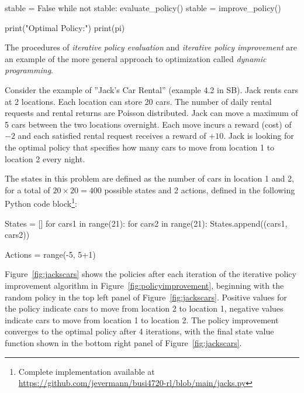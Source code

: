 \begin{samepage}
\begin{pythoncode}
stable = False
while not stable:
    evaluate_policy()
    stable = improve_policy()

print("Optimal Policy:")
print(pi)
\end{pythoncode}
\end{samepage}

The procedures of \emph{iterative policy evaluation} and \emph{iterative policy improvement} are an example of the more general approach to optimization called \emph{dynamic programming}.

Consider the example of ''Jack's Car Rental'' (example 4.2 in SB). Jack rents cars at 2 locations. Each location can store 20 cars. The number of daily rental requests and rental returns are Poisson distributed. Jack can move a maximum of 5 cars between the two locations overnight. Each move incurs a reward (cost) of $-2$ and each satisfied rental request receives a reward of $+10$. Jack is looking for the optimal policy that specifies how many cars to move from location 1 to location 2 every night. 

The states in this problem are defined as the number of cars in location 1 and 2, for a total of $20 \times 20 = 400$ possible states and 2 actions, defined in the following Python code block\footnote{Complete implementation available at \url{https://github.com/jevermann/busi4720-rl/blob/main/jacks.py}}:

\begin{samepage}
\begin{pythoncode}
States = []
for cars1 in range(21):
    for cars2 in range(21):
        States.append((cars1, cars2))
        
Actions = range(-5, 5+1)
\end{pythoncode}
\end{samepage}

Figure~\ref{fig:jackscars} shows the policies after each iteration of the iterative policy improvement algorithm in Figure~\ref{fig:policyimprovement}, beginning with the random policy in the top left panel of Figure~\ref{fig:jackscars}. Positive values for the policy indicate cars to move from location 2 to location 1, negative values indicate cars to move from location 1 to location 2. The policy improvement converges to the optimal policy after 4 iterations, with the final state value function shown in the bottom right panel of Figure~\ref{fig:jackscars}.

